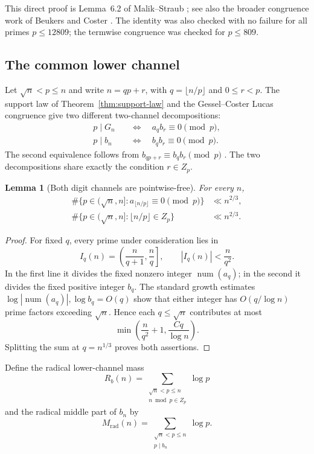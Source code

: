 \documentclass[11pt]{amsart}
\DeclareMathOperator{\num}{num}
\theoremstyle{plain}
\newtheorem{lemma}{Lemma}
\theoremstyle{remark}
\begin{document}
This direct proof is Lemma~6.2 of Malik--Straub
\cite{MalikStraub2016}; see also the broader congruence work of Beukers
and Coster \cite{Beukers1985,Coster1988}.  The identity was also
checked with no failure for all primes $p\leq12809$; the termwise
congruence was checked for $p\leq809$.

\subsection{The common lower channel}

Let $\sqrt n<p\leq n$ and write $n=qp+r$, with
$q=\lfloor n/p\rfloor$ and $0\leq r<p$.  The support law of
Theorem~\ref{thm:support-law} and the Gessel--Coster Lucas congruence give
two different two-channel decompositions:
\begin{align}
 p\mid G_n
 &\quad\Longleftrightarrow\quad a_qb_r\equiv0\pmod p,
 \label{eq:G-two-channel}\\
 p\mid b_n
 &\quad\Longleftrightarrow\quad b_qb_r\equiv0\pmod p.
 \label{eq:b-two-channel}
\end{align}
The second equivalence follows from
$b_{qp+r}\equiv b_qb_r\pmod p$ \cite{Gessel1982,Coster1988}.
The two decompositions share exactly the condition $r\in Z_p$.

\begin{lemma}[Both digit channels are pointwise-free]
\label{lem:digit-channels}
For every $n$,
\begin{align*}
 \#\{p\in(\sqrt n,n]:a_{\lfloor n/p\rfloor}\equiv0\pmod p\}
 &\ll n^{2/3},\\
 \#\{p\in(\sqrt n,n]:\lfloor n/p\rfloor\in Z_p\}
 &\ll n^{2/3}.
\end{align*}
\end{lemma}

\begin{proof}
For fixed $q$, every prime under consideration lies in
\[
 I_q(n)=\left(\frac n{q+1},\frac nq\right],
 \qquad |I_q(n)|<\frac n{q^2}.
\]
In the first line it divides the fixed nonzero integer $\num(a_q)$; in
the second it divides the fixed positive integer $b_q$.  The standard
growth estimates $\log|\num(a_q)|,\log b_q=O(q)$ show that either integer
has $O(q/\log n)$ prime factors exceeding $\sqrt n$.  Hence each
$q\leq\sqrt n$ contributes at most
\[
 \min\left(\frac n{q^2}+1,\frac{Cq}{\log n}\right).
\]
Splitting the sum at $q=n^{1/3}$ proves both assertions.
\end{proof}

Define the radical lower-channel mass
\[
 R_b(n)=\sum_{\substack{\sqrt n<p\leq n\\n\bmod p\in Z_p}}\log p
\]
and the radical middle part of $b_n$ by
\[
 M_{\mathrm{rad}}(n)
 =\sum_{\substack{\sqrt n<p\leq n\\p\mid b_n}}\log p.
\]
\end{document}
